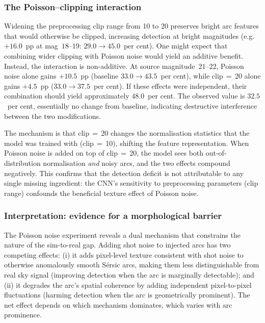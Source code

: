 \documentclass[fleqn,usenatbib]{rasti}
\begin{document}
\subsubsection{The Poisson--clipping interaction}

Widening the preprocessing clip range from 10 to 20 preserves bright arc features that would otherwise be clipped, increasing detection at bright magnitudes (e.g.\ $+16.0$~pp at mag~$18$--$19$: $29.0 \to 45.0$~per cent).  One might expect that combining wider clipping with Poisson noise would yield an additive benefit.  Instead, the interaction is non-additive.  At source magnitude~$21$--$22$, Poisson noise alone gains $+10.5$~pp (baseline $33.0 \to 43.5$~per cent), while clip$\,=\,$20 alone gains $+4.5$~pp ($33.0 \to 37.5$~per cent).  If these effects were independent, their combination should yield approximately $48.0$~per cent.  The observed value is $32.5$~per cent, essentially no change from baseline, indicating destructive interference between the two modifications.

The mechanism is that clip$\,=\,$20 changes the normalisation statistics that the model was trained with (clip$\,=\,$10), shifting the feature representation.  When Poisson noise is added on top of clip$\,=\,$20, the model sees both out-of-distribution normalisation \emph{and} noisy arcs, and the two effects compound negatively.  This confirms that the detection deficit is not attributable to any single missing ingredient: the CNN's sensitivity to preprocessing parameters (clip range) confounds the beneficial texture effect of Poisson noise.


\subsubsection{Interpretation: evidence for a morphological barrier}

The Poisson noise experiment reveals a dual mechanism that constrains the nature of the sim-to-real gap.  Adding shot noise to injected arcs has two competing effects: (i) it adds pixel-level texture consistent with shot noise to otherwise anomalously smooth S\'{e}rsic arcs, making them less distinguishable from real sky signal (improving detection when the arc is marginally detectable); and (ii) it degrades the arc's spatial coherence by adding independent pixel-to-pixel fluctuations (harming detection when the arc is geometrically prominent).  The net effect depends on which mechanism dominates, which varies with arc prominence.
\end{document}
